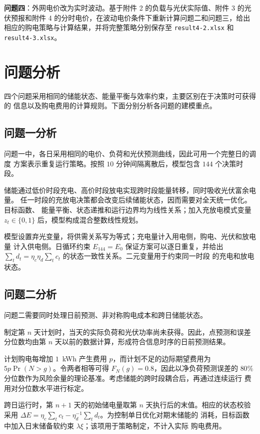 \documentclass[withoutpreface,bwprint]{cumcmthesis}
\begin{document}
\textbf{问题四}：外网电价改为实时波动。基于附件 2 的负载与光伏实际值、附件 3
的光伏预报和附件 4 的分时电价，在波动电价条件下重新计算问题二和问题三，给出
相应的购电策略与计算结果，并将完整策略分别保存至 \texttt{result4-2.xlsx} 和
\texttt{result4-3.xlsx}。

\section{问题分析}

四个问题采用相同的储能状态、能量平衡与效率约束，主要区别在于决策时可获得的
信息以及购电费用的计算规则。下面分别分析各问题的建模重点。

\subsection{问题一分析}

问题一中，各日采用相同的电价、负荷和光伏预测曲线，因此可用一个完整日的调度
方案表示重复运行策略。按照 $10$ 分钟间隔离散后，模型包含 $144$ 个决策时段。

储能通过低价时段充电、高价时段放电实现跨时段能量转移，同时吸收光伏富余电量。
任一时段的充放电决策都会改变后续储能状态，因而需要对全天统一优化。目标函数、
能量平衡、状态递推和运行边界均为线性关系；加入充放电模式变量
$z_t\in\{0,1\}$ 后，模型构成混合整数线性规划。

模型设置弃光变量，将供需关系写为等式；充电量计入用电侧，购电、光伏和放电量
计入供电侧。日循环约束 $E_{144}=E_0$ 保证方案可以逐日重复，并给出
$\sum_t d_t=\eta_c\eta_d\sum_t c_t$ 的状态一致性关系。二元变量用于约束同一时段
的充电和放电状态。

\subsection{问题二分析}

问题二需要同时处理日前预测、非对称购电成本和跨日储能状态。

制定第 $n$ 天计划时，当天的实际负荷和光伏功率尚未获得。因此，点预测和误差
分位数均由第 $n$ 天以前的数据计算，形成符合信息时序的日前预测结果。

计划购电每增加 $1$~kWh 产生费用 $p$，而计划不足的边际期望费用为
$5p\Pr(N>g)$。令两者相等可得 $F_N(g)=0.8$，因此以净负荷预测误差的
$80\%$ 分位数作为风险余量的理论基准。考虑储能的跨时段耦合后，再通过连续运行
费用对分位数水平进行标定。

跨日运行时，第 $n+1$ 天的初始储电量取第 $n$ 天执行后的末值。相应的状态校验采用
$\Delta E=\eta_c\sum_t c_t-\eta_d^{-1}\sum_t d_t$。为控制单日优化对期末储能的
消耗，目标函数中加入日末储备软约束 $\lambda\xi$；该项用于策略制定，不计入实际
购电费用。
\end{document}
